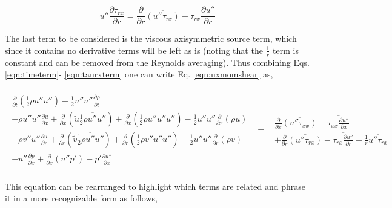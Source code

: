 \begin{equation}
	\overline{u''\frac{\partial \tau_{rx}}{\partial r}} = \frac{\partial}{\partial r}\overline{(u''\tau_{rx})} -
	\overline{\tau_{rx}\frac{\partial u''}{\partial r}}
\label{eqn:taurxterm}
\end{equation}

	The last term to be considered is the viscous axisymmetric source term, which since it contains no derivative 
terms will be left as is (noting that the $\frac{1}{r}$ term is constant and can be removed from the Reynolds averaging).  
Thus combining Eqs. \ref{eqn:timeterm}- \ref{eqn:taurxterm} one can write Eq. \ref{eqn:uxmomshear} as,

\begin{displaymath}
   \begin{array}{ccc}
      \begin{array}{c}	
	\frac{\partial}{\partial t}\overline{(\frac{1}{2}\rho u'' u'')} - \overline{\frac{1}{2}u''u''
	\frac{\partial \rho}{\partial t}} \\
	+ \overline{\rho u'' u''}\frac{\partial \tilde u}{\partial x}
	+ \frac{\partial}{\partial x}(\tilde u \overline{\frac{1}{2}\rho u'' u''}) + \frac{\partial}{\partial x}(\frac{1}{2}
	\overline{\rho u'' u'' u''})- \overline{\frac{1}{2}u''u''\frac{\partial}{\partial x}(\rho u)} \\
	+ \overline{\rho v'' u''}\frac{\partial \tilde u}{\partial r}
	+ \frac{\partial}{\partial r}(\tilde v \overline{\frac{1}{2}\rho u'' u''}) + \frac{\partial}{\partial r}(\frac{1}{2}
	\overline{\rho v'' u'' u''})- \overline{\frac{1}{2}u''u''\frac{\partial}{\partial r}(\rho v)} \\
	+ \overline{u''}\frac{\partial \overline{p}}{\partial x} 
	+ \overline{\frac{\partial}{\partial x}(u''p')} - \overline {p'\frac{\partial u''}{\partial x}} \\
      \end{array}
	& = &
      \begin{array}{c}
	\frac{\partial}{\partial x}\overline{(u''\tau_{xx})} - \overline{\tau_{xx}\frac{\partial u''}{\partial x}}\\
	 + \frac{\partial}{\partial r}\overline{(u''\tau_{rx})} -
	\overline{\tau_{rx}\frac{\partial u''}{\partial r}} +  \frac{1}{r}\overline{u''\tau_{rx}}
      \end{array}	
   \end{array}
\end{displaymath}

	This equation can be rearranged to highlight which terms are related and phrase it in a more recognizable form as
follows,

